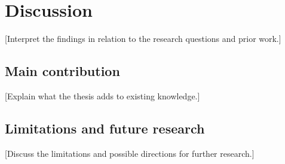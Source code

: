 \chapter{Discussion}
[Interpret the findings in relation to the research questions and prior work.]

\section{Main contribution}
[Explain what the thesis adds to existing knowledge.]

\section{Limitations and future research}
[Discuss the limitations and possible directions for further research.]
